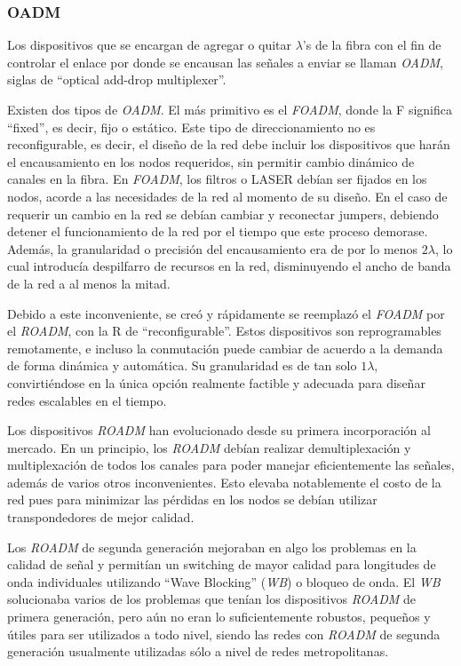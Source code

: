 \subsubsection{OADM}
\label{sec:oadm}

Los dispositivos que se encargan de agregar o quitar $\lambda$'s de la
fibra con el fin de controlar el enlace por donde se encausan las
señales a enviar se llaman \emph{OADM}, siglas de ``optical add-drop
multiplexer''.

Existen dos tipos de \emph{OADM}. El más primitivo es el \emph{FOADM},
donde la F significa ``fixed'', es decir, fijo o estático. Este tipo
de direccionamiento no es reconfigurable, es decir, el diseño de la
red debe incluir los dispositivos que harán el encausamiento en los
nodos requeridos, sin permitir cambio dinámico de canales en la
fibra. En \emph{FOADM}, los filtros o LASER debían ser fijados en los
nodos, acorde a las necesidades de la red al momento de su diseño. En
el caso de requerir un cambio en la red se debían cambiar y reconectar
jumpers, debiendo detener el funcionamiento de la red por el tiempo
que este proceso demorase. Además, la granularidad o precisión del
encausamiento era de por lo menos $2\lambda$, lo cual introducía
despilfarro de recursos en la red, disminuyendo el ancho de banda de
la red a al menos la mitad.

Debido a este inconveniente, se creó y rápidamente se reemplazó el
\emph{FOADM} por el \emph{ROADM}, con la R de
``reconfigurable''. Estos dispositivos son reprogramables remotamente,
e incluso la conmutación puede cambiar de acuerdo a la demanda de
forma dinámica y automática. Su granularidad es de tan solo
$1\lambda$, convirtiéndose en la única opción realmente factible y
adecuada para diseñar redes escalables en el tiempo.

Los dispositivos \emph{ROADM} han evolucionado desde su primera
incorporación al mercado\cite{roadmevolves}. En un principio, los 
\emph{ROADM} debían realizar demultiplexación y multiplexación de
todos los canales para poder manejar eficientemente las señales,
además de varios otros inconvenientes. Esto elevaba notablemente el 
costo de la red pues para minimizar las pérdidas en los nodos se 
debían utilizar transpondedores de mejor calidad.

Los \emph{ROADM} de segunda generación mejoraban en algo los problemas
en la calidad de señal y permitían un switching de mayor calidad para
longitudes de onda individuales utilizando ``Wave Blocking'' (\emph{WB})
o bloqueo de onda. El \emph{WB} solucionaba varios de los problemas que
tenían los dispositivos \emph{ROADM} de primera generación, pero aún no
eran lo suficientemente robustos, pequeños y útiles para ser utilizados
a todo nivel, siendo las redes con \emph{ROADM} de segunda generación 
usualmente utilizadas sólo a nivel de redes metropolitanas.

